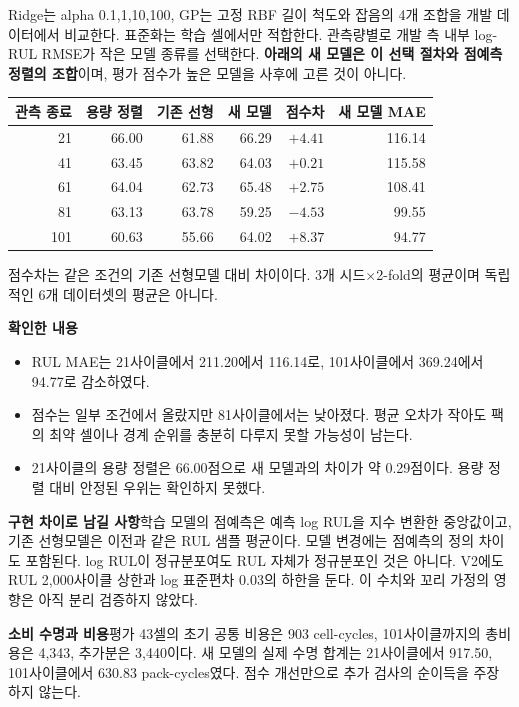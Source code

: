 \documentclass[11pt,a4paper]{article}
\begin{document}
Ridge는 alpha 0.1,1,10,100, GP는 고정 RBF 길이 척도와 잡음의 4개 조합을 개발 데이터에서 비교한다. 표준화는 학습 셀에서만 적합한다. 관측량별로 개발 측 내부 log-RUL RMSE가 작은 모델 종류를 선택한다. \textbf{아래의 새 모델은 이 선택 절차와 점예측 정렬의 조합}이며, 평가 점수가 높은 모델을 사후에 고른 것이 아니다.

\begin{center}
\begin{tabular}{rrrrrr}
\toprule
관측 종료 & 용량 정렬 & 기존 선형 & 새 모델 & 점수차 & 새 모델 MAE \\
\midrule
21  & 66.00 & 61.88 & 66.29 & $+4.41$ & 116.14 \\
41  & 63.45 & 63.82 & 64.03 & $+0.21$ & 115.58 \\
61  & 64.04 & 62.73 & 65.48 & $+2.75$ & 108.41 \\
81  & 63.13 & 63.78 & 59.25 & $-4.53$ & 99.55 \\
101 & 60.63 & 55.66 & 64.02 & $+8.37$ & 94.77 \\
\bottomrule
\end{tabular}
\end{center}
점수차는 같은 조건의 기존 선형모델 대비 차이이다. 3개 시드$\times$2-fold의 평균이며 독립적인 6개 데이터셋의 평균은 아니다.

\textbf{확인한 내용}
\begin{itemize}
\item RUL MAE는 21사이클에서 211.20에서 116.14로, 101사이클에서 369.24에서 94.77로 감소하였다.
\item 점수는 일부 조건에서 올랐지만 81사이클에서는 낮아졌다. 평균 오차가 작아도 팩의 최약 셀이나 경계 순위를 충분히 다루지 못할 가능성이 남는다.
\item 21사이클의 용량 정렬은 66.00점으로 새 모델과의 차이가 약 0.29점이다. 용량 정렬 대비 안정된 우위는 확인하지 못했다.
\end{itemize}

\textbf{구현 차이로 남길 사항}\quad 학습 모델의 점예측은 예측 log RUL을 지수 변환한 중앙값이고, 기존 선형모델은 이전과 같은 RUL 샘플 평균이다. 모델 변경에는 점예측의 정의 차이도 포함된다. log RUL이 정규분포여도 RUL 자체가 정규분포인 것은 아니다. V2에도 RUL 2,000사이클 상한과 log 표준편차 0.03의 하한을 둔다. 이 수치와 꼬리 가정의 영향은 아직 분리 검증하지 않았다.

\textbf{소비 수명과 비용}\quad 평가 43셀의 초기 공통 비용은 903 cell-cycles, 101사이클까지의 총비용은 4,343, 추가분은 3,440이다. 새 모델의 실제 수명 합계는 21사이클에서 917.50, 101사이클에서 630.83 pack-cycles였다. 점수 개선만으로 추가 검사의 순이득을 주장하지 않는다.
\end{document}
